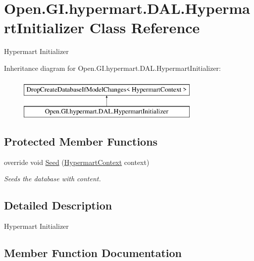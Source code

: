 \hypertarget{class_open_1_1_g_i_1_1hypermart_1_1_d_a_l_1_1_hypermart_initializer}{}\section{Open.\+G\+I.\+hypermart.\+D\+A\+L.\+Hypermart\+Initializer Class Reference}
\label{class_open_1_1_g_i_1_1hypermart_1_1_d_a_l_1_1_hypermart_initializer}


Hypermart Initializer  


Inheritance diagram for Open.\+G\+I.\+hypermart.\+D\+A\+L.\+Hypermart\+Initializer\+:\begin{figure}[H]
\begin{center}
\leavevmode
\includegraphics[height=2.000000cm]{class_open_1_1_g_i_1_1hypermart_1_1_d_a_l_1_1_hypermart_initializer}
\end{center}
\end{figure}
\subsection*{Protected Member Functions}
\begin{DoxyCompactItemize}
\item 
override void \hyperlink{class_open_1_1_g_i_1_1hypermart_1_1_d_a_l_1_1_hypermart_initializer_a2e19732fa6f8db0a6b72049415947016}{Seed} (\hyperlink{class_open_1_1_g_i_1_1hypermart_1_1_d_a_l_1_1_hypermart_context}{Hypermart\+Context} context)
\begin{DoxyCompactList}\small\item\em Seeds the database with content. \end{DoxyCompactList}\end{DoxyCompactItemize}


\subsection{Detailed Description}
Hypermart Initializer 



\subsection{Member Function Documentation}
\hypertarget{class_open_1_1_g_i_1_1hypermart_1_1_d_a_l_1_1_hypermart_initializer_a2e19732fa6f8db0a6b72049415947016}{}\label{class_open_1_1_g_i_1_1hypermart_1_1_d_a_l_1_1_hypermart_initializer_a2e19732fa6f8db0a6b72049415947016} 

